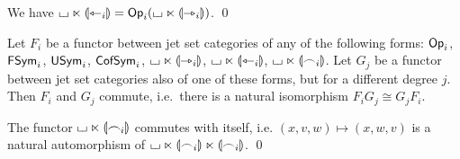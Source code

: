\documentclass[a4paper]{memoir}
\begin{document}
\begin{corollary} \label{thm:twisted-prism-op}
	We have $\loch \multip \rival{\tej_i} = \Op_i(\loch \multip \rival{\jet_i})$. \qed
\end{corollary}
\begin{corollary} \label{thm:commute-diff-degree}
	Let $F_i$ be a functor between jet set categories of any of the following forms: $\Op_i$, $\Fsym_i$, $\Usym_i$, $\Csym_i$, $\loch \multip \rival{\jet_i}$, $\loch \multip \rival{\tej_i}$, $\loch \multip \rival{\edge_i}$.
	Let $G_j$ be a functor between jet set categories also of one of these forms, but for a different degree $j$.
	Then $F_i$ and $G_j$ commute, i.e.\ there is a natural isomorphism $F_i G_j \cong G_j F_i$.
\end{corollary}
\begin{corollary} \label{thm:commute-symmetric}
The functor $\loch \multip \rival{\edge_i}$ commutes with itself, i.e. $(x, v, w) \mapsto (x, w, v)$ is a natural automorphism of $\loch \multip \rival{\edge_i} \multip \rival{\edge_i}$. \qed
\end{corollary}
\end{document}

